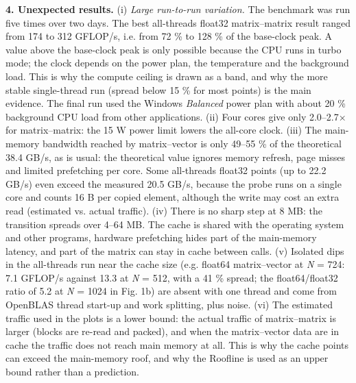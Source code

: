 \documentclass[10pt,a4paper]{article}
\begin{document}
\textbf{4. Unexpected results.} (i) \emph{Large run-to-run variation.} The benchmark was run five times over two days. The best all-threads float32 matrix–matrix result ranged from 174 to 312 GFLOP/s, i.e. from 72 \% to 128 \% of the base-clock peak. A value above the base-clock peak is only possible because the CPU runs in turbo mode; the clock depends on the power plan, the temperature and the background load. This is why the compute ceiling is drawn as a band, and why the more stable single-thread run (spread below 15 \% for most points) is the main evidence. The final run used the Windows \emph{Balanced} power plan with about 20 \% background CPU load from other applications. (ii) Four cores give only 2.0–2.7× for matrix–matrix: the 15 W power limit lowers the all-core clock. (iii) The main-memory bandwidth reached by matrix–vector is only 49–55 \% of the theoretical 38.4 GB/s, as is usual: the theoretical value ignores memory refresh, page misses and limited prefetching per core. Some all-threads float32 points (up to 22.2 GB/s) even exceed the measured 20.5 GB/s, because the probe runs on a single core and counts 16 B per copied element, although the write may cost an extra read (estimated vs. actual traffic). (iv) There is no sharp step at 8 MB: the transition spreads over 4–64 MB. The cache is shared with the operating system and other programs, hardware prefetching hides part of the main-memory latency, and part of the matrix can stay in cache between calls. (v) Isolated dips in the all-threads run near the cache size (e.g. float64 matrix–vector at \emph{N} = 724: 7.1 GFLOP/s against 13.3 at \emph{N} = 512, with a 41 \% spread; the float64/float32 ratio of 5.2 at \emph{N} = 1024 in Fig. 1b) are absent with one thread and come from OpenBLAS thread start-up and work splitting, plus noise. (vi) The estimated traffic used in the plots is a lower bound: the actual traffic of matrix–matrix is larger (blocks are re-read and packed), and when the matrix–vector data are in cache the traffic does not reach main memory at all. This is why the cache points can exceed the main-memory roof, and why the Roofline is used as an upper bound rather than a prediction.
\end{document}
